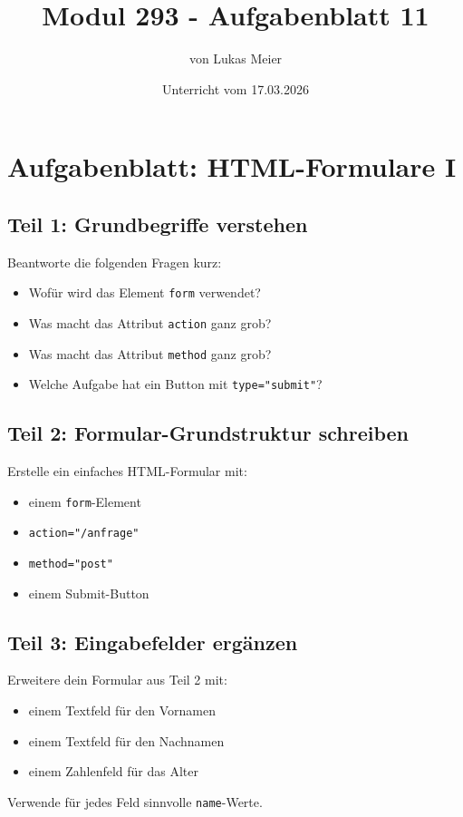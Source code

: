 \documentclass[a4paper,12pt]{article}
\title{Modul 293 - Aufgabenblatt 11}
\author{von Lukas Meier}
\date{Unterricht vom 17.03.2026}
\begin{document}
\maketitle

\section*{Aufgabenblatt: HTML-Formulare I}

\subsection*{Teil 1: Grundbegriffe verstehen}
Beantworte die folgenden Fragen kurz:
\begin{itemize}
  \item Wofür wird das Element \texttt{form} verwendet?
  \item Was macht das Attribut \texttt{action} ganz grob?
  \item Was macht das Attribut \texttt{method} ganz grob?
  \item Welche Aufgabe hat ein Button mit \texttt{type="submit"}?
\end{itemize}

\subsection*{Teil 2: Formular-Grundstruktur schreiben}
Erstelle ein einfaches HTML-Formular mit:
\begin{itemize}
  \item einem \texttt{form}-Element
  \item \texttt{action="/anfrage"}
  \item \texttt{method="post"}
  \item einem Submit-Button
\end{itemize}

\subsection*{Teil 3: Eingabefelder ergänzen}
Erweitere dein Formular aus Teil 2 mit:
\begin{itemize}
  \item einem Textfeld für den Vornamen
  \item einem Textfeld für den Nachnamen
  \item einem Zahlenfeld für das Alter
\end{itemize}

Verwende für jedes Feld sinnvolle \texttt{name}-Werte.
\end{document}

